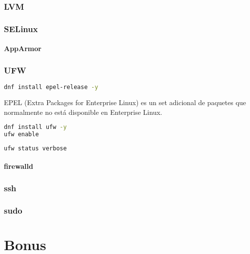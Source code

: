 \documentclass[a4paper]{article}
\begin{document}
\subsubsection{LVM}

\subsubsection{SELinux}
\paragraph{AppArmor}

\subsubsection{UFW}
\begin{lstlisting}[language=Bash]
dnf install epel-release -y
\end{lstlisting}
EPEL (Extra Packages for Enterprise Linux)  es un set adicional de paquetes que normalmente no está disponible en Enterprise Linux.
\begin{lstlisting}[language=Bash]
dnf install ufw -y
ufw enable
\end{lstlisting}
\begin{lstlisting}[language=Bash]
ufw status verbose
\end{lstlisting}
\paragraph{firewalld}

\subsubsection{ssh}

\subsubsection{sudo}

\section{Bonus}
\end{document}
